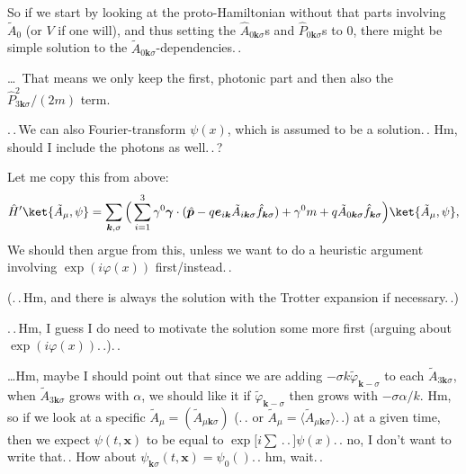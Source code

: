 \documentclass{report}
\begin{document}
So if we start by looking at the proto-Hamiltonian without that parts involving $\tilde A_0$ (or $V$ if one will), and thus setting the $\hat A_{0 \boldsymbol{k}\sigma}$s and $\hat P_{0 \boldsymbol{k}\sigma}$s to 0, there might be simple solution to the $\tilde A_{0 \boldsymbol{k}\sigma}$-dependencies.\,. 

\ldots\ That means we only keep the first, photonic part and then also the $\hat P^2_{3 \boldsymbol k \sigma} / (2m)$ term. 

.\,.\,We can also Fourier-transform $\psi(x)$, which is assumed to be a solution.\,. Hm, should I include the photons as well.\,.\,? 

Let me copy this from above:
\begin{align}
	\hat H' \ket{\tilde A_\mu, \psi} = 
		\sum_{\boldsymbol{k}, \sigma}\Big(
			\sum_{i=1}^{3} \gamma^0 \boldsymbol \gamma \cdot (
				\hat{\boldsymbol p\,}\! - 
					q \boldsymbol{e}_{i\boldsymbol{k}} 
					\tilde A_{i\boldsymbol{k}\sigma}
					\hat f_{\boldsymbol{k}\sigma}
			) +
			\gamma^0 m + q \tilde A_{0\boldsymbol{k}\sigma}
			\hat f_{\boldsymbol{k}\sigma}
		\Big) 
		\ket{\tilde A_\mu, \psi},
	\label{H'(A-tilde)_01}
\end{align}
We should then argue from this, unless we want to do a heuristic argument involving $\exp(i\varphi(x))$ first/instead.\,. 

(.\,.\,Hm, and there is always the solution with the Trotter expansion if necessary.\,.) 

.\,.\,Hm, I guess I do need to motivate the solution some more first (arguing about $\exp(i\varphi(x))$.\,.).\,. 

\ldots Hm, maybe I should point out that since we are adding $-\sigma k\tilde\varphi_{\boldsymbol{k}-\sigma}$ to each $\tilde A_{3\boldsymbol{k}\sigma}$, when $\tilde A_{3\boldsymbol{k}\sigma}$ grows with $\alpha$, we should like it if $\tilde\varphi_{\boldsymbol{k}-\sigma}$ then grows with $-\sigma \alpha / k$. Hm, so if we look at a specific $\tilde A_\mu = (\tilde A_{\mu\boldsymbol{k}\sigma})$ (.\,. or $\tilde A_\mu = \langle\tilde A_{\mu\boldsymbol{k}\sigma}\rangle$.\,.) at a given time, then we expect $\psi(t, \boldsymbol{x})$ to be equal to $\exp\big[i\sum \,.\,.\,\big] \psi(x)$.\,. no, I don't want to write that.\,. How about $\psi_{\boldsymbol{k}\sigma}(t, \boldsymbol{x}) = \psi_0()$.\,. hm, wait.\,. %
\end{document}
